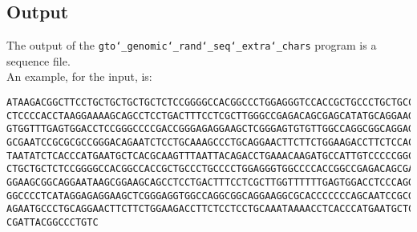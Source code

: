 \subsection*{Output}
The output of the \texttt{gto\char`_genomic\char`_rand\char`_seq\char`_extra\char`_chars} program is a sequence file.\\
An example, for the input, is:
\begin{lstlisting}
ATAAGACGGCTTCCTGCTGCTGCTGCTCTCCGGGGCCACGGCCCTGGAGGGTCCACCGCTGCCCTGCTGCCATTGTCCCC
CTCCCCACCTAAGGAAAAGCAGCCTCCTGACTTTCCTCGCTTGGGCCGAGACAGCGAGCATATGCAGGAAGCGGCAGGAA
GTGGTTTGAGTGGACCTCCGGGCCCCGACCGGGAGAGGAAGCTCGGGAGTGTGTTGGCCAGGCGGCAGGAGACCAGTGCC
GCGAATCCGCGCGCCGGGACAGAATCTCCTGCAAAGCCCTGCAGGAACTTCTTCTGGAAGACCTTCTCCACCCCCCCAGC
TAATATCTCACCCATGAATGCTCACGCAAGTTTAATTACAGACCTGAAACAAGATGCCATTGTCCCCCGGCCTCCTGCTG
CTGCTGCTCTCCGGGGCCACGGCCACCGCTGCCCTGCCCCTGGAGGGTGGCCCCACCGGCCGAGACAGCGAGCATATGCA
GGAAGCGGCAGGAATAAGCGGAAGCAGCCTCCTGACTTTCCTCGCTTGGTTTTTTGAGTGGACCTCCCAGGCCAGTGCCG
GGCCCCTCATAGGAGAGGAAGCTCGGGAGGTGGCCAGGCGGCAGGAAGGCGCACCCCCCCAGCAATCCGCGCGCCGGGAC
AGAATGCCCTGCAGGAACTTCTTCTGGAAGACCTTCTCCTCCTGCAAATAAAACCTCACCCATGAATGCTCACGCAAGTT
CGATTACGGCCCTGTC
\end{lstlisting}